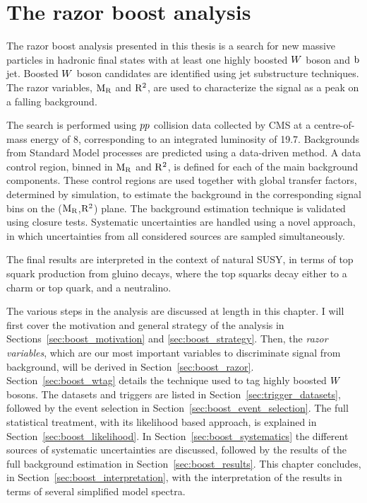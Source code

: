 \chapter{The razor boost analysis \label{chap:razorboost}}

\vspace{1eM}

The razor boost analysis presented in this thesis is a search for new massive particles in hadronic
final states with at least one highly boosted $W$ boson and $\mathrm{b}$ jet.  Boosted $W$ boson
candidates are identified using jet substructure techniques. The razor variables, $\mathrm{M_R}$ and $\mathrm{R^2}$,
are used to characterize the signal as a peak on a falling background.

The search is performed using ${p}{p}$ collision data collected by CMS at a centre-of-mass energy of
8\TeV, corresponding to an integrated luminosity of 19.7\fbinv.  
Backgrounds from Standard Model processes are predicted using a data-driven method. 
A data control region, binned in $\mathrm{M_R}$ and $\mathrm{R^2}$, is defined for each of the main background
components. These control regions are used together with global transfer factors, determined by
simulation, to estimate the background in the corresponding signal bins on the ($\mathrm{M_R}$,$\mathrm{R^2}$)
plane. The background estimation technique is validated using closure tests. 
Systematic uncertainties are handled using a novel approach, in which uncertainties from all
considered sources are sampled simultaneously. 

The final results are interpreted in the context of natural SUSY, in terms of top squark production
from gluino decays, where the top squarks decay either to a charm or top quark, and a neutralino. 


The various steps in the analysis are discussed at length in this chapter. 
I will first cover the motivation and general strategy of the analysis in 
Sections~\ref{sec:boost_motivation} and \ref{sec:boost_strategy}. Then, the \textit{razor
variables}, which are our most important variables to discriminate signal from background, will be
derived in Section~\ref{sec:boost_razor}. Section~\ref{sec:boost_wtag} details the technique used to
tag highly boosted $W$ bosons. 
The datasets and triggers are listed in Section~\ref{sec:trigger_datasets}, followed by the event
selection in Section~\ref{sec:boost_event_selection}. 
The full statistical treatment, with its likelihood based approach, is explained in 
Section~\ref{sec:boost_likelihood}. In Section~\ref{sec:boost_systematics} the different sources of
systematic uncertainties are discussed, followed by the results of the full background estimation in
Section~\ref{sec:boost_results}. This chapter concludes, in Section~\ref{sec:boost_interpretation},
with the interpretation of the results in terms of several simplified model spectra. 

